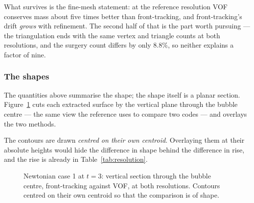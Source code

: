 What survives is the fine-mesh statement: at the reference resolution VOF
conserves mass about five times better than front-tracking, and front-tracking's
drift \emph{grows} with refinement. The second half of that is the part worth
pursuing --- the triangulation ends with the same vertex and triangle counts at
both resolutions, and the surgery count differs by only 8.8\%, so neither
explains a factor of nine. 

\subsubsection{The shapes}

The quantities above summarise the shape; the shape itself is a planar section.
Figure~\ref{fig:newtshape} cuts each extracted surface by the vertical plane
through the bubble centre --- the same view the reference uses to compare two
codes --- and overlays the two methods.

The contours are drawn \emph{centred on their own centroid}. Overlaying them at
their absolute heights would hide the difference in shape behind the difference
in rise, and the rise is already in Table~\ref{tab:resolution}.

\begin{figure}[htbp]
\centering
{}\hfill
{}
\caption{Newtonian case 1 at $t=3$: vertical section through the bubble centre,
front-tracking against VOF, at both resolutions. Contours centred on their own
centroid so that the comparison is of shape.}
\label{fig:newtshape}
\end{figure}

